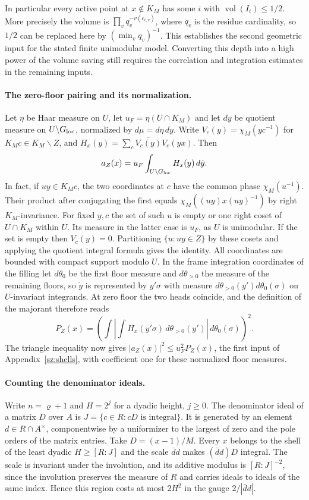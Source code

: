 In particular every active point at $x\notin K_M$ has some $i$ with
$\operatorname{vol}(I_i)\le 1/2$. More precisely the volume is
$\prod_v q_v^{-v(c_{i,v})}$, where $q_v$ is the residue cardinality,
so $1/2$ can be replaced here by $(\min_v q_v)^{-1}$.
This establishes the second geometric input for the stated finite
unimodular model. Converting this depth into a high power of the
volume saving still requires the correlation and integration estimates
in the remaining inputs.

\paragraph{The zero-floor pairing and its normalization.}
Let $\eta$ be Haar measure on $U$, let $u_F=\eta(U\cap K_M)$ and
let $d\dot y$ be quotient measure on $U\backslash G_{\rm loc}$,
normalized by $d\mu=d\eta\,d\dot y$. Write
$V_c(y)=\chi_M(yc^{-1})$ for $K_Mc\in K_M\backslash Z$, and
$H_x(y)=\sum_c\overline{V_c(y)}V_c(yx)$. Then
\[
 a_Z(x)=u_F\int_{U\backslash G_{\rm loc}} H_x(y)\,d\dot y .
\]
In fact, if $u y\in K_Mc$, the two coordinates at $c$ have the
common phase $\chi_M(u^{-1})$. Their product after conjugating the
first equals $\chi_M((uy)x(uy)^{-1})$ by right $K_M$-invariance.
For fixed $y,c$ the set of such $u$ is empty or one right coset
of $U\cap K_M$ within $U$. Its measure in the latter case is $u_F$,
as $U$ is unimodular. If the set is empty then $V_c(y)=0$.
Partitioning $\{u:uy\in Z\}$ by these cosets and applying the
quotient integral formula gives the identity. All coordinates are
bounded with compact support modulo $U$.
In the frame integration coordinates of the filling let $d\theta_0$
be the first floor measure and $d\theta_{>0}$ the measure of the
remaining floors, so $\dot y$ is represented by $y'\sigma$ with
measure $d\theta_{>0}(y')d\theta_0(\sigma)$ on $U$-invariant
integrands. At zero floor the two heads coincide, and the definition
of the majorant therefore reads
\[
  P_Z(x)=
 \left(\int\left|\int H_x(y'\sigma)\,d\theta_{>0}(y')\right|
                  \,d\theta_0(\sigma)\right)^2 .
\]
The triangle inequality now gives $|a_Z(x)|^2\le u_F^2 P_Z(x)$,
the first input of Appendix~\ref{sz:shells}, with coefficient one
for these normalized floor measures.

\paragraph{Counting the denominator ideals.}
Write $n=\varrho+1$ and $H=2^j$ for a dyadic height, $j\ge0$.
The denominator ideal of a matrix $D$ over $A$ is
$J=\{c\in R:cD\text{ is integral}\}$. It is generated by an element
$d\in R\cap A^\times$, componentwise by a uniformizer to the
largest of zero and the pole orders of the matrix entries.
Take $D=(x-1)/M$. Every $x$ belongs to the shell of the least dyadic
$H\ge [R:J]$ and the scale $\bar d d$ makes $(\bar d d)D$ integral.
The scale is invariant under the involution, and its additive modulus
is $[R:J]^{-2}$, since the involution preserves the measure of $R$
and carries ideals to ideals of the same index. Hence this region
costs at most $2 H^2$ in the gauge $2/|\bar d d|$.

